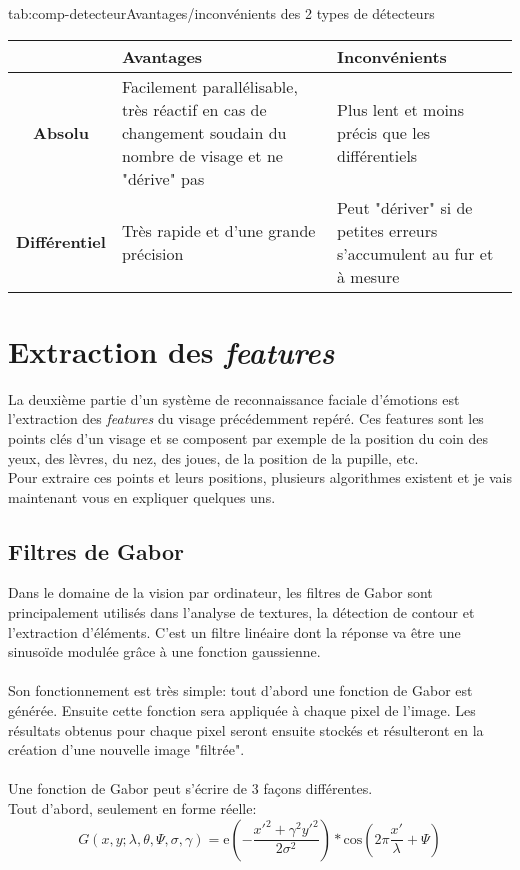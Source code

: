 \documentclass[poster]{polytech/polytech}
\begin{document}
\begin{Table}{tab:comp-detecteur}{Avantages/inconvénients des 2 types de détecteurs}
	\begin{tabular}{|c|p{6cm}|p{6cm}|}
		\hline
		 &\textbf{Avantages} &\textbf{Inconvénients}\\\hline
		\textbf{Absolu} &Facilement parallélisable, très réactif en cas de changement soudain du nombre de visage et ne "dérive" pas &Plus lent et moins précis que les différentiels \\\hline
		\textbf{Différentiel} &Très rapide et d'une grande précision &Peut "dériver" si de petites erreurs s'accumulent au fur et à mesure\\
		\hline
	\end{tabular}
\end{Table}

\newpage
\section{Extraction des \textit{features}}
La deuxième partie d'un système de reconnaissance faciale d'émotions est l'extraction des \textit{features} du visage précédemment repéré. Ces features sont les points clés d'un visage et se composent par exemple de la position du coin des yeux, des lèvres, du nez, des joues, de la position de la pupille, etc. \\
Pour extraire ces points et leurs positions, plusieurs algorithmes existent et je vais maintenant vous en expliquer quelques uns.

\subsection{Filtres de Gabor}
Dans le domaine de la vision par ordinateur, les filtres de Gabor sont principalement utilisés dans l'analyse de textures, la détection de contour et l'extraction d'éléments. C'est un filtre linéaire dont la réponse va être une sinusoïde modulée grâce à une fonction gaussienne.\\
\\
Son fonctionnement est très simple: tout d'abord une fonction de Gabor est générée. Ensuite cette fonction sera appliquée à chaque pixel de l'image. Les résultats obtenus pour chaque pixel seront ensuite stockés et résulteront en la création d'une nouvelle image "filtrée".\\
\\
Une fonction de Gabor peut s'écrire de 3 façons différentes.\\
Tout d'abord, seulement en forme réelle:
\begin{equation}
G(x,y;\lambda ,\theta ,\Psi ,\sigma ,\gamma )=\mathrm{e}(- \frac{x'^2+\gamma ^2 y'^2}{2\sigma ^2})*\mathrm{cos}(2\pi \frac{x'}{\lambda}+\Psi)
\label{gabor_reel}
\end{equation}
\end{document}
